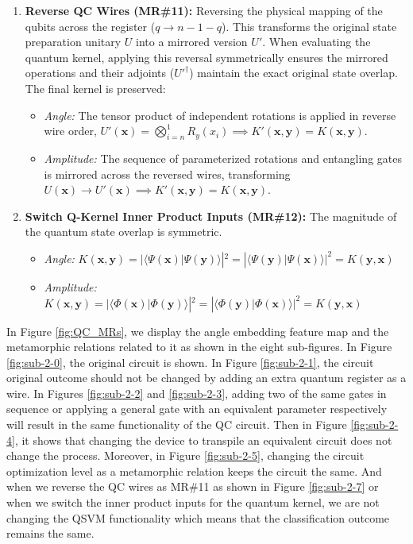 \documentclass[12pt,a4paper]{article}
\begin{document}
\begin{enumerate}
		\item \textbf{Reverse QC Wires (MR\#11):} Reversing the physical mapping of the qubits across the register ($q \to n-1-q$). This transforms the original state preparation unitary $U$ into a mirrored version $U'$. When evaluating the quantum kernel, applying this reversal symmetrically ensures the mirrored operations and their adjoints ($U'^\dagger$) maintain the exact original state overlap. The final kernel is preserved:
		\begin{itemize}
			\item \textit{Angle:} The tensor product of independent rotations is applied in reverse wire order, $U'(\mathbf{x}) = \bigotimes_{i=n}^{1} R_y(x_i) \implies K'(\mathbf{x}, \mathbf{y}) = K(\mathbf{x}, \mathbf{y})$.
			\item \textit{Amplitude:} The sequence of parameterized rotations and entangling gates is mirrored across the reversed wires, transforming $U(\mathbf{x}) \to U'(\mathbf{x}) \implies K'(\mathbf{x}, \mathbf{y}) = K(\mathbf{x}, \mathbf{y})$.
		\end{itemize}
			
			\item \textbf{Switch Q-Kernel Inner Product Inputs (MR\#12):} The magnitude of the quantum state overlap is symmetric. 
			\begin{itemize}
				\item \textit{Angle:} $K(\mathbf{x}, \mathbf{y}) = |\langle \Psi(\mathbf{x}) | \Psi(\mathbf{y}) \rangle|^2 = |\langle \Psi(\mathbf{y}) | \Psi(\mathbf{x}) \rangle|^2 = K(\mathbf{y}, \mathbf{x})$
				\item \textit{Amplitude:} $K(\mathbf{x}, \mathbf{y}) = |\langle \Phi(\mathbf{x}) | \Phi(\mathbf{y}) \rangle|^2 = |\langle \Phi(\mathbf{y}) | \Phi(\mathbf{x}) \rangle|^2 = K(\mathbf{y}, \mathbf{x})$
			\end{itemize}
		\end{enumerate}
	
	
	In Figure \ref{fig:QC_MRs}, we display the angle embedding feature map and the metamorphic relations related to it as shown in the eight sub-figures. In Figure \ref{fig:sub-2-0}, the original circuit is shown. In Figure \ref{fig:sub-2-1}, the circuit original outcome should not be changed by adding an extra quantum register as a wire. In Figures \ref{fig:sub-2-2} and \ref{fig:sub-2-3}, adding two of the same gates in sequence or applying a general gate with an equivalent parameter respectively will result in the same functionality of the QC circuit. Then in Figure \ref{fig:sub-2-4}, it shows that changing the device to transpile an equivalent circuit does not change the process. Moreover, in Figure \ref{fig:sub-2-5}, changing the circuit optimization level as a metamorphic relation keeps the circuit the same. And when we reverse the QC wires as MR\#11 as shown in Figure \ref{fig:sub-2-7} or when we switch the inner product inputs for the quantum kernel, we are not changing the QSVM functionality which means that the classification outcome remains the same.
	
\end{document}
